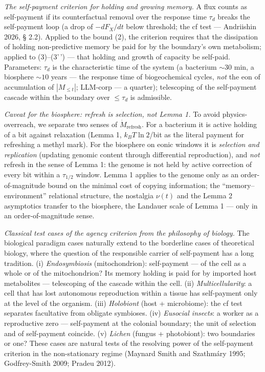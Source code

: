 \documentclass[pdflatex,sn-mathphys-ay]{sn-jnl}
\begin{document}
\emph{The self-payment criterion for holding and growing memory.} A flux counts as self-payment if its counterfactual removal over the response time \(\tau_d\) breaks the self-payment loop (a drop of \(-dF_X/dt\) below threshold; the cf test --- Andriishin 2026, § 2.2). Applied to the bound (2), the criterion requires that the dissipation of holding non-predictive memory be paid for by the boundary's own metabolism; applied to (3)--(3'\,') --- that holding and growth of capacity be self-paid. Parameters: \(\tau_d\) is the characteristic time of the system (a bacterium \(\sim 30\) min, a biosphere \(\sim 10\) years --- the response time of biogeochemical cycles, \emph{not} the eon of accumulation of \(|M_{\le t}|\); LLM-corp --- a quarter); telescoping of the self-payment cascade within the boundary over \(\le \tau_d\) is admissible.



\emph{Caveat for the biosphere: refresh is selection, not Lemma 1.} To avoid physics-overreach, we separate two senses of \(\dot M_{\text{refresh}}\). For a bacterium it is active holding of a bit against relaxation (Lemma 1, \(k_B T \ln 2\)/bit as the literal payment for refreshing a methyl mark). For the biosphere on eonic windows it is \emph{selection and replication} (updating genomic content through differential reproduction), and \emph{not} refresh in the sense of Lemma 1: the genome is not held by active correction of every bit within a \(\tau_{1/2}\) window. Lemma 1 applies to the genome only as an order-of-magnitude bound on the minimal cost of copying information; the ``memory--environment'' relational structure, the nostalgia \(\nu(t)\) and the Lemma 2 asymptotics transfer to the biosphere, the Landauer scale of Lemma 1 --- only in an order-of-magnitude sense.



\emph{Classical test cases of the agency criterion from the philosophy of biology.} The biological paradigm cases naturally extend to the borderline cases of theoretical biology, where the question of the responsible carrier of self-payment has a long tradition. (i) \emph{Endosymbiosis} (mitochondrion): self-payment --- of the cell as a whole or of the mitochondrion? Its memory holding is paid for by imported host metabolites --- telescoping of the cascade within the cell. (ii) \emph{Multicellularity}: a cell that has lost autonomous reproduction within a tissue has self-payment only at the level of the organism. (iii) \emph{Holobiont} (host + microbiome): the cf test separates facultative from obligate symbioses. (iv) \emph{Eusocial insects}: a worker as a reproductive zero --- self-payment at the colonial boundary; the unit of selection and of self-payment coincide. (v) \emph{Lichen} (fungus + photobiont): two boundaries or one? These cases are natural tests of the resolving power of the self-payment criterion in the non-stationary regime (Maynard Smith and Szathmáry 1995; Godfrey-Smith 2009; Pradeu 2012).
\end{document}
